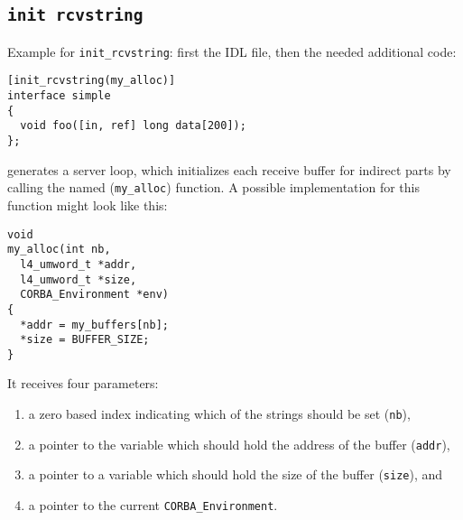 \subsection{\tt init rcvstring}
Example for \verb|init_rcvstring|: first the IDL file, then the 
needed additional code:
\begin{verbatim}
[init_rcvstring(my_alloc)]
interface simple
{
  void foo([in, ref] long data[200]);
};
\end{verbatim}

\dice{} generates a server loop, which initializes each receive
buffer for indirect parts by calling the named (\verb|my_alloc|)
function. A possible implementation for this function might look
like this:

\begin{verbatim}
void
my_alloc(int nb, 
  l4_umword_t *addr, 
  l4_umword_t *size, 
  CORBA_Environment *env)
{
  *addr = my_buffers[nb];
  *size = BUFFER_SIZE;
}
\end{verbatim}

It receives four parameters: 
\begin{enumerate}
\item a zero based index indicating which of the strings should 
be set (\verb|nb|),
\item a pointer to the variable which should hold the address of the
buffer (\verb|addr|),
\item a pointer to a variable which should hold the size of the
buffer (\verb|size|), and
\item a pointer to the current \verb|CORBA_Environment|.
\end{enumerate}


